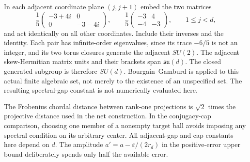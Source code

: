 \begin{remark}
In each adjacent coordinate plane $(j,j+1)$ embed the two matrices
\[
 \frac15\begin{pmatrix}-3+4i&0\\0&-3-4i\end{pmatrix},\qquad
 \frac15\begin{pmatrix}-3&4\\-4&-3\end{pmatrix},
 \qquad 1\le j<d,
\]
and act identically on all other coordinates. Include their inverses and
the identity. Each pair has infinite-order eigenvalues, since its trace
$-6/5$ is not an integer, and its two torus closures generate the adjacent
$SU(2)$. The adjacent skew-Hermitian matrix units and their brackets
span $\mathfrak{su}(d)$. The closed generated subgroup is therefore
$SU(d)$. Bourgain--Gamburd is applied to this actual finite algebraic
set, not merely to the existence of an unspecified set. The resulting
spectral-gap constant is not numerically evaluated here.
\end{remark}
The Frobenius chordal distance between rank-one projections is $\sqrt2$
times the projective distance used in the net construction. In the
conjugacy-cap comparison, choosing one member of a nonempty target ball
avoids imposing any spectral condition on its arbitrary center. All
adjacent-gap and cap constants here depend on $d$. The amplitude
$ a'=a-\varepsilon/(2r_d)$ in the positive-error upper bound deliberately
spends only half the available error.

